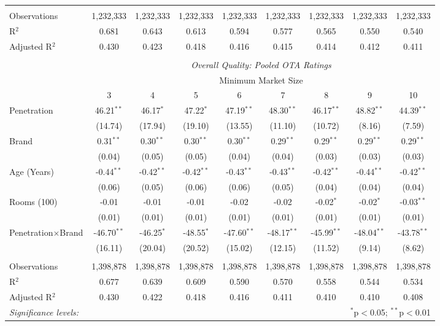 \begin{table}[!htbp]
{\begin{tabular}{@{\extracolsep{5pt}}lcccccccc}
 \hline
 \\[-1.8ex]
Observations & 1,232,333 & 1,232,333 & 1,232,333 & 1,232,333 & 1,232,333 & 1,232,333 & 1,232,333 & 1,232,333 \\ 
R$^{2}$ & 0.681 & 0.643 & 0.613 & 0.594 & 0.577 & 0.565 & 0.550 & 0.540 \\ 
Adjusted R$^{2}$ & 0.430 & 0.423 & 0.418 & 0.416 & 0.415 & 0.414 & 0.412 & 0.411 \\ 
\hline 
\\[-1.8ex]
& \multicolumn{8}{c}{\textit{Overall Quality: Pooled OTA Ratings}} \\ 
\cline{2-9} 
& \multicolumn{8}{c}{Minimum Market Size} \\ 
 & 3 & 4 & 5 & 6 & 7 & 8 & 9 & 10\\ 
\hline  
 Penetration & 46.21$^{**}$ & 46.17$^{*}$ & 47.22$^{*}$ & 47.19$^{**}$ & 48.30$^{**}$ & 46.17$^{**}$ & 48.82$^{**}$ & 44.39$^{**}$ \\ 
  & (14.74) & (17.94) & (19.10) & (13.55) & (11.10) & (10.72) & (8.16) & (7.59) \\ 
 Brand & 0.31$^{**}$ & 0.30$^{**}$ & 0.30$^{**}$ & 0.30$^{**}$ & 0.29$^{**}$ & 0.29$^{**}$ & 0.29$^{**}$ & 0.29$^{**}$ \\ 
  & (0.04) & (0.05) & (0.05) & (0.04) & (0.04) & (0.03) & (0.03) & (0.03) \\ 
 Age (Years) & -0.44$^{**}$ & -0.42$^{**}$ & -0.42$^{**}$ & -0.43$^{**}$ & -0.43$^{**}$ & -0.42$^{**}$ & -0.44$^{**}$ & -0.42$^{**}$ \\ 
  & (0.06) & (0.05) & (0.06) & (0.06) & (0.05) & (0.04) & (0.04) & (0.04) \\ 
 Rooms (100) & -0.01 & -0.01 & -0.01 & -0.02 & -0.02 & -0.02$^{*}$ & -0.02$^{*}$ & -0.03$^{**}$ \\ 
  & (0.01) & (0.01) & (0.01) & (0.01) & (0.01) & (0.01) & (0.01) & (0.01) \\ 
 Penetration$\times$Brand & -46.70$^{**}$ & -46.25$^{*}$ & -48.55$^{*}$ & -47.60$^{**}$ & -48.17$^{**}$ & -45.99$^{**}$ & -48.04$^{**}$ & -43.78$^{**}$ \\ 
  & (16.11) & (20.04) & (20.52) & (15.02) & (12.15) & (11.52) & (9.14) & (8.62) \\ 
 \hline
 \\[-1.8ex]
Observations & 1,398,878 & 1,398,878 &  1,398,878 &  1,398,878 &  1,398,878 &  1,398,878 &  1,398,878 &  1,398,878\\ 
R$^{2}$ & 0.677 & 0.639 & 0.609 & 0.590 & 0.570 & 0.558 & 0.544 & 0.534 \\ 
Adjusted R$^{2}$ & 0.430 & 0.422 & 0.418 & 0.416 & 0.411 & 0.410 & 0.410 & 0.408 \\ 
\hline 


\textit{Significance levels:}  & \multicolumn{8}{r}{$^{*}$p$<$0.05; $^{**}$p$<$0.01} \\

\end{tabular} 
} 
\end{table} 
